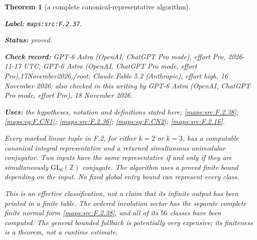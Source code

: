 \documentclass[11pt,a4paper]{article}
\newtheorem{theorem}{Theorem}[section]
\theoremstyle{definition}
\newcommand{\StatementRecord}[4]{\par\smallskip\begingroup\upshape\raggedright\noindent\textbf{Label:} \nolinkurl{#1}.\par\noindent\textbf{Status:} #2.\par\noindent\textbf{Check record:} #3.\par\noindent\textbf{Uses:} #4.\par\endgroup\smallskip}
\newcommand{\CurrentChecker}{GPT-6 Astra (OpenAI, ChatGPT Pro mode, effort Pro), 18 November 2026}
\begin{document}
\begin{theorem}[a complete canonical-representative algorithm]\label{maps:src:F.2.37}
\StatementRecord{maps:src:F.2.37}{proved}{GPT-6 Astra (OpenAI, ChatGPT Pro mode), effort Pro, 2026-11-17 UTC; GPT-6 Astra (OpenAI, ChatGPT Pro mode, effort Pro),17November2026,/root; Claude Fable 5.2 (Anthropic), effort high, 16 November 2026; also checked in this writing by \CurrentChecker}{the hypotheses, notation and definitions stated here; \cref{maps:src:F.2.38}; \cref{maps:eq:F.CN1}; \cref{maps:src:F.2.36}; \cref{maps:eq:F.CN2}; \cref{maps:src:F.2.16}}


Every marked linear tuple in F.2, for either $k=2$ or $k=3$,
has a computable canonical integral representative and a
returned simultaneous unimodular conjugator. Two inputs have
the same representative if and only if they are simultaneously
$\mathrm{GL}_6(\mathbb Z)$ conjugate. The algorithm uses a proved
finite bound depending on the input. No fixed global entry bound
can represent every class.

This is an effective classification, not a claim that its
infinite output has been printed in a finite table. The
ordered involution sector has the separate complete finite
normal form \ref{maps:src:F.2.38}, and all of its $56$ classes have been
computed. The general bounded fallback is potentially very
expensive; its finiteness is a theorem, not a runtime estimate.

\end{theorem}
\end{document}
